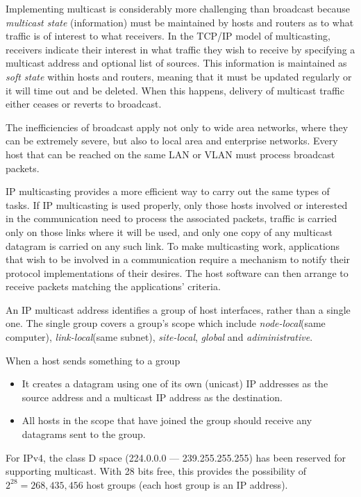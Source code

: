 Implementing multicast is considerably more challenging than broadcast because \textit{multicast state} (information) must be maintained by hosts and
routers as to what traffic is of interest to what receivers. In the TCP/IP model of multicasting, receivers indicate their interest in what traffic they wish to receive by specifying a multicast address and optional list of sources. This information is maintained as \textit{soft state} within hosts and routers, meaning that it must be updated regularly or it will time out and be deleted. When this happens, delivery of multicast traffic either ceases or reverts to broadcast.

The inefficiencies of broadcast apply not only to wide area networks, where they can be extremely severe, but also to local area and enterprise networks. Every host that can be reached on the same LAN or VLAN must process broadcast packets. 

IP multicasting provides a more efficient way to carry out the same types of tasks. If IP multicasting is used properly, only those hosts involved or interested in the communication need to process the associated packets, traffic is carried only on those links where it will be used, and only one copy of any multicast datagram is carried on any such link. To make multicasting work, applications that wish to be involved in a communication require a mechanism to notify their protocol implementations of their desires. The host software can then arrange to receive packets matching the applications’ criteria.

An IP multicast address identifies a group of host interfaces, rather than a
single one. The single group covers a group's scope which include \textit{node-local}(same computer), \textit{link-local}(same subnet), \textit{site-local}, \textit{global} and \textit{adiministrative}.

When a host sends something to a group
\begin{itemize}
\item It creates a datagram using one of its own (unicast) IP addresses as the source address and a multicast IP address as the destination.
\item All hosts in the scope that have joined the group should receive any datagrams sent to the group.
\end{itemize}

For IPv4, the class D space (224.0.0.0 --- 239.255.255.255) has been reserved for supporting multicast. With 28 bits free, this provides the possibility of $2^{28}=268,435,456$ host groups (each host group is an IP address).